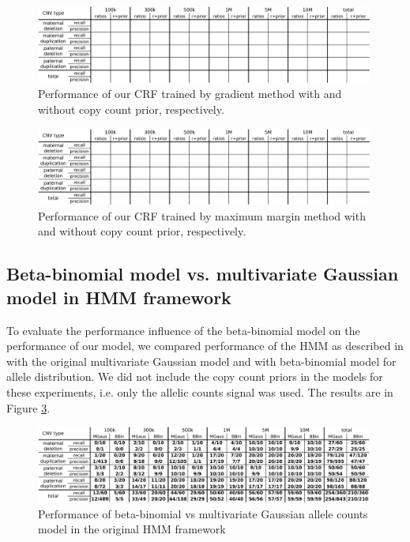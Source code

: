 \begin{figure}
\caption{Performance of our CRF trained by gradient method with and without copy count prior, respectively.}
\label{fig:CRFbyGM}
\centering
\includegraphics[width=0.99\textwidth]{figures/crf_gradient}
\end{figure}

\begin{figure}
\caption{Performance of our CRF trained by maximum margin method with and without copy count prior, respectively.}
\label{fig:CRFbyMM}
\centering
\includegraphics[width=0.99\textwidth]{figures/crf_margin}
\end{figure}

\subsection{Beta-binomial model vs. multivariate Gaussian model in HMM framework}
To evaluate the performance influence of the beta-binomial model on the performance of our model, we compared performance of the HMM as described in \cite{rampasek2014fcnv} with the original multivariate Gaussian model and with beta-binomial model for allele distribution. We did not include the copy count priors in the models for these experiments, i.e. only the allelic counts signal was used. The results are in Figure \ref{fig:BBvsMG}.

\begin{figure}
\caption{Performance of beta-binomial vs multivariate Gaussian allele counts model in the original HMM framework}
\label{fig:BBvsMG}
\centering
\includegraphics[width=0.99\textwidth]{figures/hmm_bb_mg}
\end{figure}



